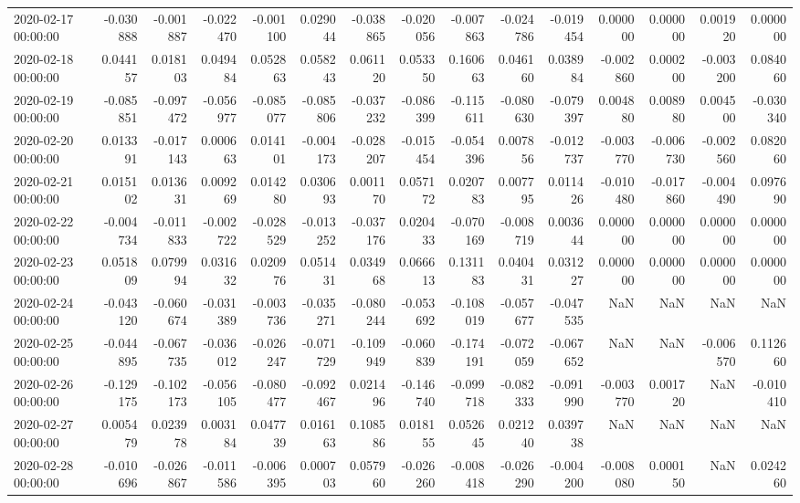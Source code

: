 \begin{tabular}{lrrrrrrrrrrrrrr}
2020-02-17 00:00:00 & -0.030888 & -0.001887 & -0.022470 & -0.001100 & 0.029044 & -0.038865 & -0.020056 & -0.007863 & -0.024786 & -0.019454 & 0.000000 & 0.000000 & 0.001920 & 0.000000 \\
2020-02-18 00:00:00 & 0.044157 & 0.018103 & 0.049484 & 0.052863 & 0.058243 & 0.061120 & 0.053350 & 0.160663 & 0.046160 & 0.038984 & -0.002860 & 0.000200 & -0.003200 & 0.084060 \\
2020-02-19 00:00:00 & -0.085851 & -0.097472 & -0.056977 & -0.085077 & -0.085806 & -0.037232 & -0.086399 & -0.115611 & -0.080630 & -0.079397 & 0.004880 & 0.008980 & 0.004500 & -0.030340 \\
2020-02-20 00:00:00 & 0.013391 & -0.017143 & 0.000663 & 0.014101 & -0.004173 & -0.028207 & -0.015454 & -0.054396 & 0.007856 & -0.012737 & -0.003770 & -0.006730 & -0.002560 & 0.082060 \\
2020-02-21 00:00:00 & 0.015102 & 0.013631 & 0.009269 & 0.014280 & 0.030693 & 0.001170 & 0.057172 & 0.020783 & 0.007795 & 0.011426 & -0.010480 & -0.017860 & -0.004490 & 0.097690 \\
2020-02-22 00:00:00 & -0.004734 & -0.011833 & -0.002722 & -0.028529 & -0.013252 & -0.037176 & 0.020433 & -0.070169 & -0.008719 & 0.003644 & 0.000000 & 0.000000 & 0.000000 & 0.000000 \\
2020-02-23 00:00:00 & 0.051809 & 0.079994 & 0.031632 & 0.020976 & 0.051431 & 0.034968 & 0.066613 & 0.131183 & 0.040431 & 0.031227 & 0.000000 & 0.000000 & 0.000000 & 0.000000 \\
2020-02-24 00:00:00 & -0.043120 & -0.060674 & -0.031389 & -0.003736 & -0.035271 & -0.080244 & -0.053692 & -0.108019 & -0.057677 & -0.047535 & NaN & NaN & NaN & NaN \\
2020-02-25 00:00:00 & -0.044895 & -0.067735 & -0.036012 & -0.026247 & -0.071729 & -0.109949 & -0.060839 & -0.174191 & -0.072059 & -0.067652 & NaN & NaN & -0.006570 & 0.112660 \\
2020-02-26 00:00:00 & -0.129175 & -0.102173 & -0.056105 & -0.080477 & -0.092467 & 0.021496 & -0.146740 & -0.099718 & -0.082333 & -0.091990 & -0.003770 & 0.001720 & NaN & -0.010410 \\
2020-02-27 00:00:00 & 0.005479 & 0.023978 & 0.003184 & 0.047739 & 0.016163 & 0.108586 & 0.018155 & 0.052645 & 0.021240 & 0.039738 & NaN & NaN & NaN & NaN \\
2020-02-28 00:00:00 & -0.010696 & -0.026867 & -0.011586 & -0.006395 & 0.000703 & 0.057960 & -0.026260 & -0.008418 & -0.026290 & -0.004200 & -0.008080 & 0.000150 & NaN & 0.024260 \\

\end{tabular}
